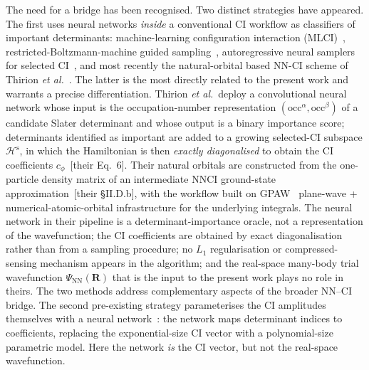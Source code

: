 \documentclass[journal=jctcce,manuscript=article,layout=traditional]{achemso}
\begin{document}
The need for a bridge has been recognised. Two distinct strategies
have appeared. The first uses neural networks \emph{inside} a
conventional CI workflow as classifiers of important determinants:
machine-learning configuration interaction
(MLCI)~\cite{Coe2018MLCI,Coe2019MLCIPEC}, restricted-Boltzmann-machine
guided sampling~\cite{RBMCI2024}, autoregressive neural samplers for
selected CI~\cite{Thompson2026ARNN}, and most recently the
natural-orbital based NN-CI scheme of Thirion \emph{et
al.}~\cite{Thirion2025NONNCI}. The latter is the most directly related
to the present work and warrants a precise differentiation. Thirion
\emph{et al.}\ deploy a convolutional neural network whose input is the
occupation-number representation $(\mathrm{occ}^{\alpha},
\mathrm{occ}^{\beta})$ of a candidate Slater determinant and whose
output is a binary importance score; determinants identified as
important are added to a growing selected-CI subspace
$\mathcal{H}^{\mathrm{s}}$, in which the Hamiltonian is then
\emph{exactly diagonalised} to obtain the CI coefficients
$c_{\phi}$~[their Eq.\ 6]. Their natural orbitals are constructed from
the one-particle density matrix of an intermediate NNCI ground-state
approximation~[their \S II.D.b], with the workflow built on
GPAW~\cite{Enkovaara2010GPAW} plane-wave + numerical-atomic-orbital
infrastructure for the underlying integrals. The neural network in their pipeline is a
determinant-importance oracle, not a representation of the
wavefunction; the CI coefficients are obtained by exact diagonalisation
rather than from a sampling procedure; no $L_1$ regularisation or
compressed-sensing mechanism appears in the algorithm; and the
real-space many-body trial wavefunction $\Psi_{\mathrm{NN}}(\mathbf{R})$
that is the input to the present work plays no role in theirs. The
two methods address complementary aspects of the broader NN--CI
bridge. The second pre-existing strategy parameterises the CI
amplitudes themselves with a neural
network~\cite{Liu2024NNBackflow,Liu2025NNBackflowOpt,Carleo2017NQS}: the
network maps determinant indices to coefficients, replacing the
exponential-size CI vector with a polynomial-size parametric model.
Here the network \emph{is} the CI vector, but not the real-space
wavefunction.
\end{document}

